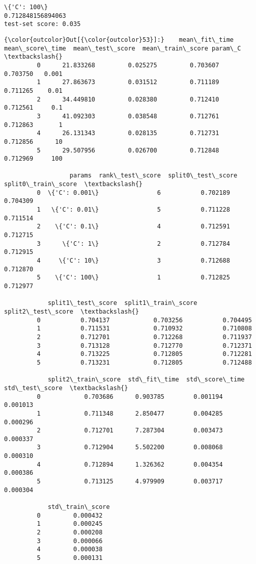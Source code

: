 \documentclass[11pt]{article}
\begin{document}
    \begin{Verbatim}[commandchars=\\\{\}]
\{'C': 100\}
0.712848156894063
test-set score: 0.035

    \end{Verbatim}

            \begin{Verbatim}[commandchars=\\\{\}]
{\color{outcolor}Out[{\color{outcolor}53}]:}    mean\_fit\_time  mean\_score\_time  mean\_test\_score  mean\_train\_score param\_C  \textbackslash{}
         0      21.833268         0.025275         0.703607          0.703750   0.001   
         1      27.863673         0.031512         0.711189          0.711265    0.01   
         2      34.449810         0.028380         0.712410          0.712561     0.1   
         3      41.092303         0.038548         0.712761          0.712863       1   
         4      26.131343         0.028135         0.712731          0.712856      10   
         5      29.507956         0.026700         0.712848          0.712969     100   
         
                  params  rank\_test\_score  split0\_test\_score  split0\_train\_score  \textbackslash{}
         0  \{'C': 0.001\}                6           0.702189            0.704309   
         1   \{'C': 0.01\}                5           0.711228            0.711514   
         2    \{'C': 0.1\}                4           0.712591            0.712715   
         3      \{'C': 1\}                2           0.712784            0.712915   
         4     \{'C': 10\}                3           0.712688            0.712870   
         5    \{'C': 100\}                1           0.712825            0.712977   
         
            split1\_test\_score  split1\_train\_score  split2\_test\_score  \textbackslash{}
         0           0.704137            0.703256           0.704495   
         1           0.711531            0.710932           0.710808   
         2           0.712701            0.712268           0.711937   
         3           0.713128            0.712770           0.712371   
         4           0.713225            0.712805           0.712281   
         5           0.713231            0.712805           0.712488   
         
            split2\_train\_score  std\_fit\_time  std\_score\_time  std\_test\_score  \textbackslash{}
         0            0.703686      0.903785        0.001194        0.001013   
         1            0.711348      2.850477        0.004285        0.000296   
         2            0.712701      7.287304        0.003473        0.000337   
         3            0.712904      5.502200        0.008068        0.000310   
         4            0.712894      1.326362        0.004354        0.000386   
         5            0.713125      4.979909        0.003717        0.000304   
         
            std\_train\_score  
         0         0.000432  
         1         0.000245  
         2         0.000208  
         3         0.000066  
         4         0.000038  
         5         0.000131  
\end{Verbatim}
        
\end{document}
